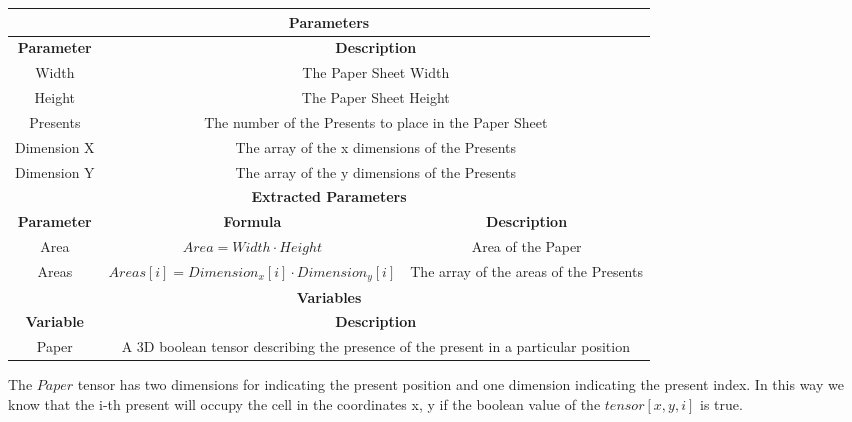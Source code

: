 \begin{center}
    \begin{adjustwidth}{-1.5cm}{}
        \begin{tabular}{|c|c|c|}
            \hline
            \multicolumn{3}{|c|}{\textbf{Parameters}} \\
            \hline
            \textbf{Parameter} & \multicolumn{2}{|c|}{\textbf{Description}} \\
            \hline
            Width & \multicolumn{2}{|c|}{The Paper Sheet Width} \\
            \hline
            Height & \multicolumn{2}{|c|}{The Paper Sheet Height} \\
            \hline
            Presents & \multicolumn{2}{|c|}{The number of the Presents to place in the Paper Sheet} \\
            \hline
            Dimension X & \multicolumn{2}{|c|}{The array of the x dimensions of the Presents} \\
            \hline
            Dimension Y & \multicolumn{2}{|c|}{The array of the y dimensions of the Presents} \\
            \hline
            \multicolumn{3}{|c|}{\textbf{Extracted Parameters}} \\
            \hline
            \textbf{Parameter} & \textbf{Formula} & \textbf{Description} \\
            \hline
            Area & $Area = Width \cdot Height$ & Area of the Paper \\
            \hline
            Areas & $Areas[i] = Dimension_x[i] \cdot Dimension_y[i]$ & The array of the areas of the Presents \\
            \hline
            \multicolumn{3}{|c|}{\textbf{Variables}} \\
            \hline
            \textbf{Variable} & \multicolumn{2}{|c|}{\textbf{Description}} \\
            \hline
            Paper &  \multicolumn{2}{|c|}{A 3D boolean tensor describing the presence of the present in a particular position} \\
            \hline
        \end{tabular}
    \end{adjustwidth}
\end{center}

The $Paper$ tensor has two dimensions for indicating the present position and one dimension indicating the present index. In this way
we know that the i-th present will occupy the cell in the coordinates x, y if the boolean value of the $tensor[x, y, i]$ is true.

